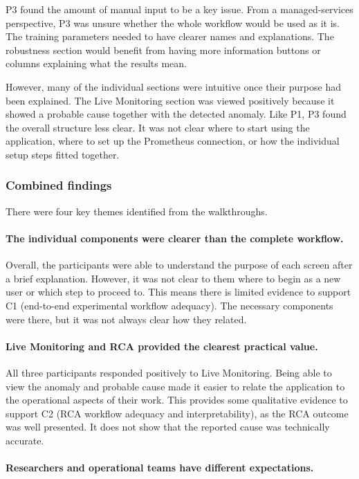 P3 found the amount of manual input to be a key issue. From a managed-services perspective, P3 was unsure whether the whole workflow would be used as it is. The training parameters needed to have clearer names and explanations. The robustness section would benefit from having more information buttons or columns explaining what the results mean.

However, many of the individual sections were intuitive once their purpose had been explained. The Live Monitoring section was viewed positively because it showed a probable cause together with the detected anomaly. Like P1, P3 found the overall structure less clear. It was not clear where to start using the application, where to set up the Prometheus connection, or how the individual setup steps fitted together.

\subsubsection{Combined findings}

There were four key themes identified from the walkthroughs.

\paragraph{The individual components were clearer than the complete workflow.}

Overall, the participants were able to understand the purpose of each screen after a brief explanation. However, it was not clear to them where to begin as a new user or which step to proceed to. This means there is limited evidence to support C1 (end-to-end experimental workflow adequacy). The necessary components were there, but it was not always clear how they related.

\paragraph{Live Monitoring and RCA provided the clearest practical value.}

All three participants responded positively to Live Monitoring. Being able to view the anomaly and probable cause made it easier to relate the application to the operational aspects of their work. This provides some qualitative evidence to support C2 (RCA workflow adequacy and interpretability), as the RCA outcome was well presented. It does not show that the reported cause was technically accurate.

\paragraph{Researchers and operational teams have different expectations.}

